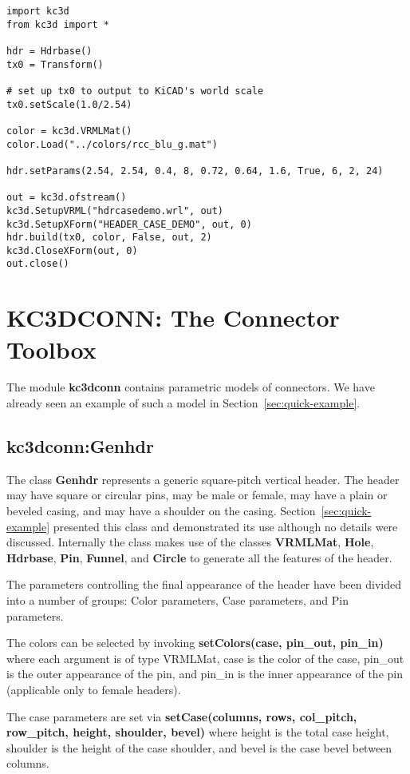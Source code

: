 \documentclass[a4paper, dvipdfm]{article}
\begin{document}
\begin{verbatim}
import kc3d
from kc3d import *

hdr = Hdrbase()
tx0 = Transform()

# set up tx0 to output to KiCAD's world scale
tx0.setScale(1.0/2.54)

color = kc3d.VRMLMat()
color.Load("../colors/rcc_blu_g.mat")

hdr.setParams(2.54, 2.54, 0.4, 8, 0.72, 0.64, 1.6, True, 6, 2, 24)

out = kc3d.ofstream()
kc3d.SetupVRML("hdrcasedemo.wrl", out)
kc3d.SetupXForm("HEADER_CASE_DEMO", out, 0)
hdr.build(tx0, color, False, out, 2)
kc3d.CloseXForm(out, 0)
out.close()
\end{verbatim}


\section{KC3DCONN: The Connector Toolbox}
The module \textbf{kc3dconn} contains parametric models
of connectors.  We have already seen an example of such
a model in Section~\ref{sec:quick-example}.

\subsection{kc3dconn:Genhdr}
The class \textbf{Genhdr} represents a generic square-pitch vertical header.
The header may have square or circular pins, may be male or female, may
have a plain or beveled casing, and may have a shoulder on the casing.
Section~\ref{sec:quick-example} presented this class and demonstrated its
use although no details were discussed. Internally the class makes use of
the classes \textbf{VRMLMat}, \textbf{Hole}, \textbf{Hdrbase}, \textbf{Pin},
\textbf{Funnel}, and \textbf{Circle} to generate all the features of the
header.

The parameters controlling the final appearance of the header have been
divided into a number of groups: Color parameters, Case parameters, and
Pin parameters.

The colors can be selected by invoking \textbf{setColors(case, pin\_out, pin\_in)}
where each argument is of type VRMLMat, case is the color of the case, pin\_out is the outer
appearance of the pin, and pin\_in is the inner appearance of the pin (applicable only
to female headers).

The case parameters are set via \textbf{setCase(columns, rows, col\_pitch, row\_pitch, height, shoulder, bevel)}
where height is the total case height, shoulder is the height of the case shoulder, and bevel is the
case bevel between columns.
\end{document}
